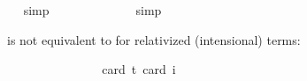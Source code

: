 \begin{isabellebody}
\isadelimproof
\ %
\endisadelimproof
%
\isatagproof
{}\isamarkupfalse%
\ simp%
\endisatagproof
{\isafoldproof}%
%
\isadelimproof
%
\endisadelimproof
\isanewline
{}\isamarkupfalse%
\ {\isachardoublequoteopen}{\isasymlfloor}\isactrlbold {\isasymforall}{\isasymalpha}{\isachardot}\ {\isacharparenleft}{\isacharparenleft}{\isasymlambda}{\isasymbeta}{\isachardot}\ \isactrlbold {\isasymbox}{\isacharparenleft}{\isasymalpha}\ {\isasymbeta}{\isacharparenright}{\isacharparenright}\ {\isacharparenleft}{\isasymtau}{\isacharcolon}{\isacharcolon}{\isasymup}{\isasymlangle}{\isasymzero}{\isasymrangle}{\isacharparenright}{\isacharparenright}\ \isactrlbold {\isasymleftrightarrow}\ \isactrlbold {\isasymbox}{\isacharparenleft}{\isacharparenleft}{\isasymlambda}{\isasymbeta}{\isachardot}\ {\isacharparenleft}{\isasymalpha}\ {\isasymbeta}{\isacharparenright}{\isacharparenright}\ {\isasymtau}{\isacharparenright}{\isasymrfloor}{\isachardoublequoteclose}%
\isadelimproof
\ %
\endisadelimproof
%
\isatagproof
{}\isamarkupfalse%
\ simp%
\endisatagproof
{\isafoldproof}%
%
\isadelimproof
%
\endisadelimproof
%
\begin{isamarkuptext}%
 is not equivalent to  for relativized (intensional) terms:%
\end{isamarkuptext}\isamarkuptrue%
\isamarkupfalse%
\ {\isachardoublequoteopen}{\isasymlfloor}\isactrlbold {\isasymforall}{\isasymalpha}{\isachardot}\ {\isacharparenleft}{\isacharparenleft}{\isasymlambda}{\isasymbeta}{\isachardot}\ \isactrlbold {\isasymbox}{\isacharparenleft}{\isasymalpha}\ {\isasymbeta}{\isacharparenright}{\isacharparenright}\ \isactrlbold {\isasymdownharpoonleft}{\isacharparenleft}{\isasymtau}{\isacharcolon}{\isacharcolon}{\isasymup}{\isasymzero}{\isacharparenright}{\isacharparenright}\ \isactrlbold {\isasymleftrightarrow}\ \isactrlbold {\isasymbox}{\isacharparenleft}\ {\isacharparenleft}{\isasymlambda}{\isasymbeta}{\isachardot}\ {\isacharparenleft}{\isasymalpha}\ {\isasymbeta}{\isacharparenright}{\isacharparenright}\ \isactrlbold {\isasymdownharpoonleft}{\isasymtau}{\isacharparenright}{\isasymrfloor}{\isachardoublequoteclose}\ \isanewline
\ \ \isamarkupfalse%
{\isacharbrackleft}card\ {\isacharprime}t{\isacharequal}{}{\isacharcomma}\ card\ i{\isacharequal}{}{\isacharbrackright}%
\isadelimproof
\ %
\endisadelimproof
%
\isatagproof
{}\isamarkupfalse%
\ %
%
\endisatagproof
{\isafoldproof}%
%
\isadelimproof
%
\endisadelimproof
\isanewline

\end{isabellebody}

